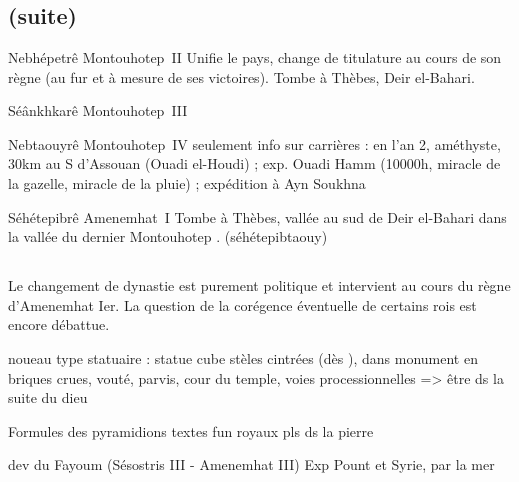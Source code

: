 \section{\MK}

\noi{} \\


\subsection{\texorpdfstring{}{XIe dynastie} (suite)}

\begin{listerois}
  \item [Nebhépetrê Montouhotep~II] Unifie le pays, change 
        de titulature au cours de son règne (au fur et à mesure de ses 
        victoires). Tombe à Thèbes, Deir el-Bahari.
  \item [Séânkhkarê Montouhotep~III]
  \item [Nebtaouyrê Montouhotep~IV] seulement info sur carrières : 
        en l'an 2, améthyste, 30km au S d'Assouan (Ouadi el-Houdi) ; 
        exp. Ouadi Hamm (10000h, miracle de la gazelle, miracle de 
        la pluie) ;
        expédition à Ayn Soukhna
  \item [Séhétepibrê Amenemhat~I] Tombe à Thèbes, vallée au sud de 
        Deir el-Bahari dans la \og vallée du dernier Montouhotep \fg.
        (séhétepibtaouy)
\end{listerois}

\subsection{\texorpdfstring{}{XIIe dynastie}}


Le changement de dynastie est purement politique et intervient au 
cours du règne d'Amenemhat Ier. La question de la corégence éventuelle 
de certains rois est encore débattue.

noueau type statuaire : statue cube
stèles cintrées (dès \PPI), dans monument en briques crues, vouté, 
parvis, cour du temple, voies processionnelles => être ds la suite 
du dieu

\TS
Formules des pyramidions
textes fun royaux pls ds la pierre

dev du Fayoum (Sésostris III - Amenemhat III)
Exp Pount et Syrie, par la mer

